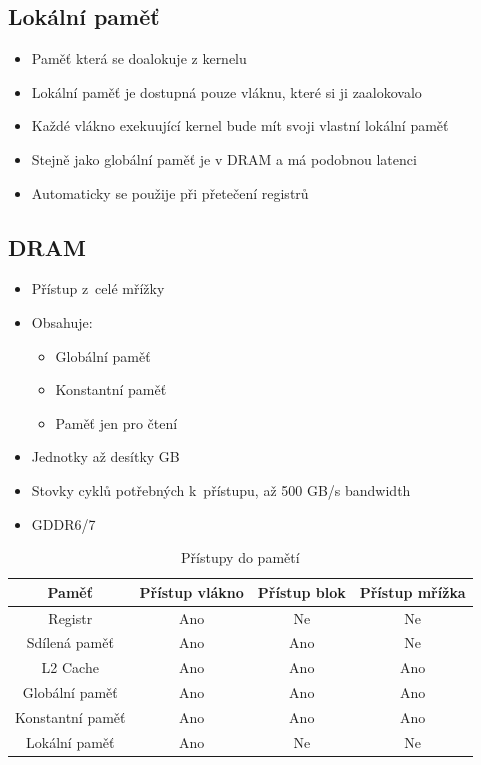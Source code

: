 \subsection{Lokální paměť}
\begin{itemize}
    \item Paměť která se doalokuje z kernelu
    \item Lokální paměť je dostupná pouze vláknu, které si ji zaalokovalo
    \item Každé vlákno exekuující kernel bude mít svoji vlastní lokální paměť
    \item Stejně jako globální paměť je v DRAM a má podobnou latenci
    \item Automaticky se použije při přetečení registrů
\end{itemize}
\subsection{DRAM}
\begin{itemize}
    \item Přístup z~celé mřížky
    \item Obsahuje:
    \begin{itemize}
        \item Globální paměť
        \item Konstantní paměť
        \item Paměť jen pro čtení
    \end{itemize}
    \item Jednotky až desítky GB
    \item Stovky cyklů potřebných k~přístupu, až 500 GB/s bandwidth
    \item GDDR6/7
\end{itemize}

\begin{table}[]
    \centering
    \begin{tabular}{|c|c|c|c|} \hline
        Paměť & Přístup vlákno & Přístup blok & Přístup mřížka \\ \hline
        Registr & Ano & Ne & Ne \\ \hline
        Sdílená paměť & Ano & Ano & Ne \\ \hline
        L2 Cache  & Ano & Ano & Ano \\ \hline
        Globální paměť & Ano & Ano & Ano  \\ \hline
        Konstantní paměť & Ano & Ano & Ano \\ \hline
        Lokální paměť & Ano & Ne & Ne \\ \hline
    \end{tabular}
    \caption{Přístupy do pamětí}
    \label{tab:my_label}
\end{table}

